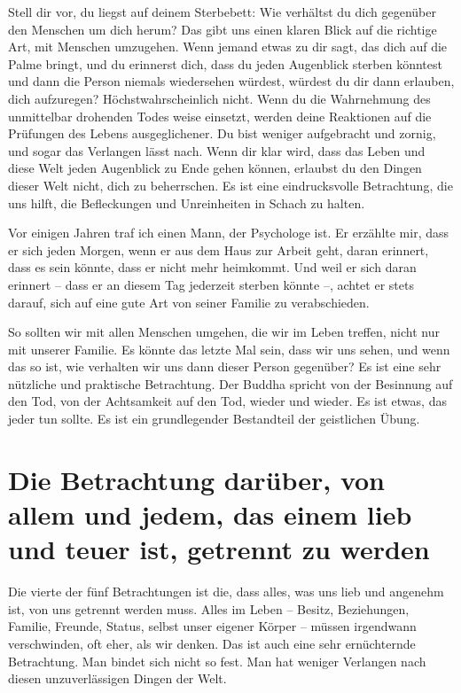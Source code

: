 \documentclass[12pt,openany]{book}
\begin{document}
Stell dir vor, du liegst auf deinem Sterbebett: Wie verhältst du dich gegenüber den Menschen um dich herum? Das gibt uns einen klaren Blick auf die richtige Art, mit Menschen umzugehen. Wenn jemand etwas zu dir sagt, das dich auf die Palme bringt, und du erinnerst dich, dass du jeden Augenblick sterben könntest und dann die Person niemals wiedersehen würdest, würdest du dir dann erlauben, dich aufzuregen? Höchstwahrscheinlich nicht. Wenn du die Wahrnehmung des unmittelbar drohenden Todes weise einsetzt, werden deine Reaktionen auf die Prüfungen des Lebens ausgeglichener. Du bist weniger aufgebracht und zornig, und sogar das Verlangen lässt nach. Wenn dir klar wird, dass das Leben und diese Welt jeden Augenblick zu Ende gehen können, erlaubst du den Dingen dieser Welt nicht, dich zu beherrschen. Es ist eine eindrucksvolle Betrachtung, die uns hilft, die Befleckungen und Unreinheiten in Schach zu halten.

Vor einigen Jahren traf ich einen Mann, der Psychologe ist. Er erzählte mir, dass er sich jeden Morgen, wenn er aus dem Haus zur Arbeit geht, daran erinnert, dass es sein könnte, dass er nicht mehr heimkommt. Und weil er sich daran erinnert – dass er an diesem Tag jederzeit sterben könnte –, achtet er stets darauf, sich auf eine gute Art von seiner Familie zu verabschieden.

So sollten wir mit allen Menschen umgehen, die wir im Leben treffen, nicht nur mit unserer Familie. Es könnte das letzte Mal sein, dass wir uns sehen, und wenn das so ist, wie verhalten wir uns dann dieser Person gegenüber? Es ist eine sehr nützliche und praktische Betrachtung. Der Buddha spricht von der Besinnung auf den Tod, von der Achtsamkeit auf den Tod, wieder und wieder. Es ist etwas, das jeder tun sollte. Es ist ein grundlegender Bestandteil der geistlichen Übung.

\section*{Die Betrachtung da\-rüber, von allem und jedem, das einem lieb und teuer ist, getrennt zu werden}

Die vierte der fünf Betrachtungen ist die, dass alles, was uns lieb und angenehm ist, von uns getrennt werden muss. Alles im Leben – Besitz, Beziehungen, Familie, Freunde, Status, selbst unser eigener Körper – müssen irgendwann verschwinden, oft eher, als wir denken. Das ist auch eine sehr ernüchternde Betrachtung. Man bindet sich nicht so fest. Man hat weniger Verlangen nach diesen unzuverlässigen Dingen der Welt.
\end{document}
